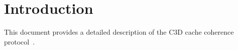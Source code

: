 \section{Introduction}

This document provides a detailed description of the C3D cache coherence
protocol~\cite{HuangKEGN2016}.
